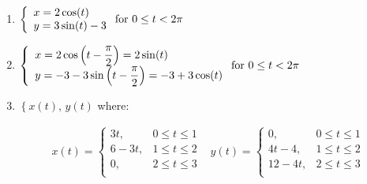 \documentclass{ximera}
\begin{document}
\begin{enumerate}
\setcounter{enumi}{\value{HW}}

\item   ${\displaystyle \left\{ \begin{array}{l} x = 2\cos(t) \\ y = 3\sin(t)-3  \end{array} \right. \vspace{.25in} \mbox{for } 0 \leq t < 2\pi }$

\item  ${\displaystyle \left\{ \begin{array}{l} x = 2\cos\left(t-\dfrac{\pi}{2}\right) = 2\sin(t) \\ y = -3 - 3\sin\left(t-\dfrac{\pi}{2}\right) =  -3+3\cos(t) \end{array} \right. \vspace{.25in} \mbox{for } 0 \leq t <  2\pi}$

\item  $\left\{ x(t), \, y(t) \right.$ where:

\[ \begin{array}{cc}

x(t) = \left\{ \begin{array}{rr}  3t,& 0 \leq t \leq 1 \\
																	6-3t, & 1 \leq t \leq 2 \\
																	0, & 2 \leq t \leq 3 \\ \end{array} \right.
&

y(t) = \left\{ \begin{array}{rr}  0,& 0 \leq t \leq 1 \\
																	4t-4, & 1 \leq t \leq 2 \\
																	12-4t, & 2 \leq t \leq 3 \\ \end{array} \right.



\end{array}\]


\setcounter{HW}{\value{enumi}}
\end{enumerate}
\end{document}
